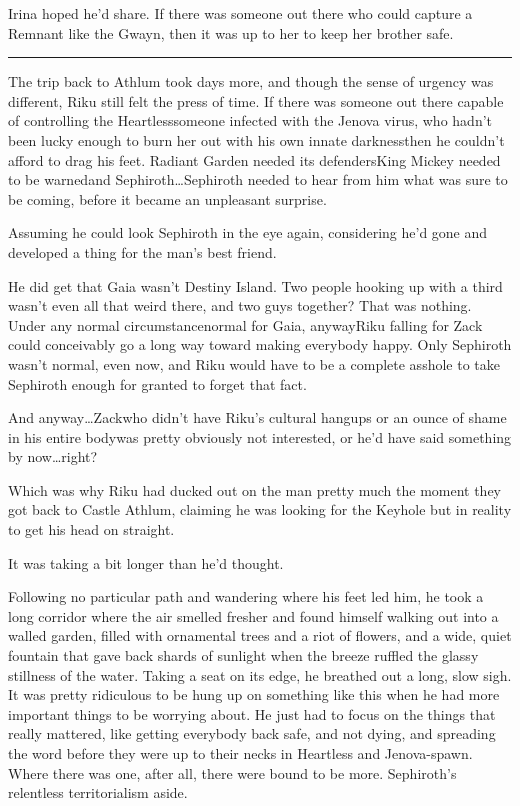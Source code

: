 Irina hoped he'd share. If there was someone out there who could capture a Remnant like the Gwayn, then it was up to her to keep her brother safe.

\fancybreak{\pfbreakdisplay}


The trip back to Athlum took days more, and though the sense of urgency was different, Riku still felt the press of time. If there was someone out there capable of controlling the Heartless\textemdash someone infected with the Jenova virus, who hadn't been lucky enough to burn her out with his own innate darkness\textemdash then he couldn't afford to drag his feet. Radiant Garden needed its defenders\textemdash King Mickey needed to be warned\textemdash and Sephiroth\ldots Sephiroth needed to hear from him what was sure to be coming, before it became an unpleasant surprise.

Assuming he could look Sephiroth in the eye again, considering he'd gone and developed a thing for the man's best friend.

He did get that Gaia wasn't Destiny Island. Two people hooking up with a third wasn't even all that weird there, and two guys together? That was nothing. Under any normal circumstance\textemdash normal for Gaia, anyway\textemdash Riku falling for Zack could conceivably go a long way toward making everybody happy. Only Sephiroth wasn't normal, even now, and Riku would have to be a complete asshole to take Sephiroth enough for granted to forget that fact.

And anyway\ldots Zack\textemdash who didn't have Riku's cultural hangups or an ounce of shame in his entire body\textemdash was pretty obviously not interested, or he'd have said something by now\ldots right?

Which was why Riku had ducked out on the man pretty much the moment they got back to Castle Athlum, claiming he was looking for the Keyhole but in reality to get his head on straight.

It was taking a bit longer than he'd thought.

Following no particular path and wandering where his feet led him, he took a long corridor where the air smelled fresher and found himself walking out into a walled garden, filled with ornamental trees and a riot of flowers, and a wide, quiet fountain that gave back shards of sunlight when the breeze ruffled the glassy stillness of the water. Taking a seat on its edge, he breathed out a long, slow sigh. It was pretty ridiculous to be hung up on something like this when he had more important things to be worrying about. He just had to focus on the things that really mattered, like getting everybody back safe, and not dying, and spreading the word before they were up to their necks in Heartless and Jenova-spawn. Where there was one, after all, there were bound to be more. Sephiroth's relentless territorialism aside.

